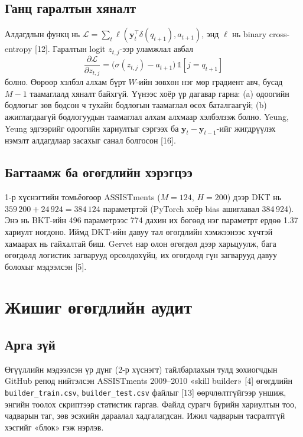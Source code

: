 \documentclass[10pt,twocolumn]{article}
\newcommand{\y}{\mathbf{y}}
\begin{document}
\subsection{Ганц гаралтын хяналт}
Алдагдлын функц нь $\mathcal L=\sum_t\ell(\y_t^{\top}\delta(q_{t+1}),a_{t+1})$, энд $\ell$ нь
binary cross-entropy [12]. Гаралтын logit $z_{t,j}$-ээр уламжлал авбал
\begin{equation}
\frac{\partial\mathcal L}{\partial z_{t,j}}=\bigl(\sigma(z_{t,j})-a_{t+1}\bigr)\,
\mathbb 1[j=q_{t+1}]
\end{equation}
болно. Өөрөөр хэлбэл алхам бүрт $W$-ийн зөвхөн нэг мөр градиент авч, бусад $M-1$ таамаглалд
хяналт байхгүй. Үүнээс хоёр үр дагавар гарна: (a) одоогийн бодлогыг зөв бодсон ч тухайн бодлогын
таамаглал өсөх баталгаагүй; (b) ажиглагдаагүй бодлогуудын таамаглал алхам алхмаар хэлбэлзэж
болно. Yeung, Yeung эдгээрийг одоогийн хариултыг сэргээх ба $\y_t-\y_{t-1}$-ийг жигдрүүлэх
нэмэлт алдагдлаар засахыг санал болгосон [16].

\subsection{Багтаамж ба өгөгдлийн хэрэгцээ}
1-р хүснэгтийн томьёогоор ASSISTments ($M=124$, $H=200$) дээр DKT нь
$359\,200+24\,924=384\,124$ параметртэй (PyTorch хоёр bias ашиглавал 384\,924). Энэ нь BKT-ийн
496 параметрээс 774 дахин их бөгөөд нэг параметрт ердөө 1.37 хариулт ногдоно. Иймд DKT-ийн
давуу тал өгөгдлийн хэмжээнээс хүчтэй хамаарах нь гайхалтай биш. Gervet нар олон өгөгдөл дээр
харьцуулж, бага өгөгдөлд логистик загварууд өрсөлдөхүйц, их өгөгдөлд гүн загварууд давуу
болохыг мэдээлсэн [5].

\section{Жишиг өгөгдлийн аудит}

\subsection{Арга зүй}
Өгүүллийн мэдээлсэн үр дүнг (2-р хүснэгт) тайлбарлахын тулд зохиогчдын GitHub репод нийтэлсэн
ASSISTments 2009--2010 «skill builder» [4] өгөгдлийн \texttt{builder\_train.csv},
\texttt{builder\_test.csv} файлыг [13] өөрчлөлтгүйгээр уншиж, энгийн тоолох скриптээр
статистик гаргав. Файлд сурагч бүрийн хариултын тоо, чадварын таг, зөв эсэхийн дараалал
хадгалагдсан. Ижил чадварын тасралтгүй хэсгийг «блок» гэж нэрлэв.
\end{document}
